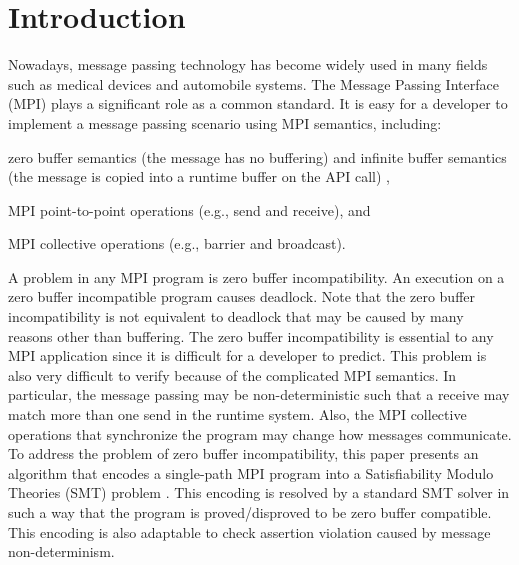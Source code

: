 \section{Introduction}
Nowadays, message passing technology has become widely used in many fields such as medical devices and automobile systems. The Message Passing Interface (MPI) plays a significant role as a common standard. It is easy for a developer to implement a message passing scenario using MPI semantics, including:

\begin{compactitem}
\item zero buffer semantics (the message has no buffering) and infinite buffer semantics (the message is copied into a runtime buffer on the API call) \cite{DBLP:conf/fm/VakkalankaVGK09},
\item MPI point-to-point operations (e.g., send and receive), and
\item MPI collective operations (e.g., barrier and broadcast).
\end{compactitem}

A problem in any MPI program is zero buffer incompatibility. An execution on a zero buffer incompatible program causes deadlock. Note that the zero buffer incompatibility is not equivalent to deadlock that may be caused by many reasons other than buffering. The zero buffer incompatibility is essential to any MPI application since it is difficult for a developer to predict. 
This problem is also very difficult to verify because of the complicated MPI semantics.
In particular, the message passing may be non-deterministic such that a receive may match more than one send in the runtime system. Also, the MPI collective operations that synchronize the program may change how messages communicate. To address the problem of zero buffer incompatibility, this paper presents an algorithm that encodes a single-path MPI program into a Satisfiability Modulo Theories (SMT) problem \cite{barrett2008satisfiability}. This encoding is resolved by a standard SMT solver in such a way that the program is proved/disproved to be zero buffer compatible. This encoding is also adaptable to check assertion violation caused by message non-determinism.

